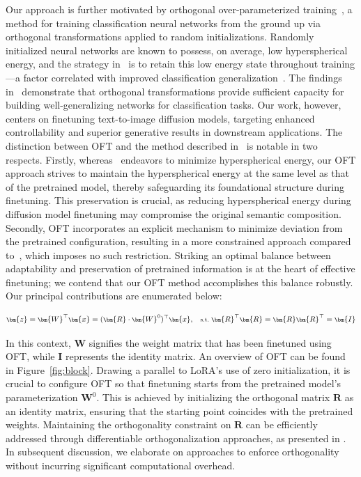 Our approach is further motivated by orthogonal over-parameterized training~\cite{liu2021orthogonal}, a method for training classification neural networks from the ground up via orthogonal transformations applied to random initializations. Randomly initialized neural networks are known to possess, on average, low hyperspherical energy, and the strategy in~\cite{liu2021orthogonal} is to retain this low energy state throughout training—a factor correlated with improved classification generalization~\cite{liu2018learning,lin2020regularizing}. The findings in~\cite{liu2021orthogonal} demonstrate that orthogonal transformations provide sufficient capacity for building well-generalizing networks for classification tasks. Our work, however, centers on finetuning text-to-image diffusion models, targeting enhanced controllability and superior generative results in downstream applications. The distinction between OFT and the method described in~\cite{liu2021orthogonal} is notable in two respects. Firstly, whereas~\cite{liu2021orthogonal} endeavors to minimize hyperspherical energy, our OFT approach strives to maintain the hyperspherical energy at the same level as that of the pretrained model, thereby safeguarding its foundational structure during finetuning. This preservation is crucial, as reducing hyperspherical energy during diffusion model finetuning may compromise the original semantic composition. Secondly, OFT incorporates an explicit mechanism to minimize deviation from the pretrained configuration, resulting in a more constrained approach compared to~\cite{liu2021orthogonal}, which imposes no such restriction. Striking an optimal balance between adaptability and preservation of pretrained information is at the heart of effective finetuning; we contend that our OFT method accomplishes this balance robustly. Our principal contributions are enumerated below:

\begin{equation}\label{eq:oft_general}
    \footnotesize
    \bm{z}=\bm{W}^\top\bm{x}=(\bm{R}\cdot\bm{W}^0)^\top\bm{x},~~~\text{s.t.}~\bm{R}^\top\bm{R}=\bm{R}\bm{R}^\top=\bm{I}
\end{equation}

In this context, $\bm{W}$ signifies the weight matrix that has been finetuned using OFT, while $\bm{I}$ represents the identity matrix. An overview of OFT can be found in Figure~\ref{fig:block}. Drawing a parallel to LoRA’s use of zero initialization, it is crucial to configure OFT so that finetuning starts from the pretrained model’s parameterization $\bm{W}^0$. This is achieved by initializing the orthogonal matrix $\bm{R}$ as an identity matrix, ensuring that the starting point coincides with the pretrained weights. Maintaining the orthogonality constraint on $\bm{R}$ can be efficiently addressed through differentiable orthogonalization approaches, as presented in \cite{liu2021orthogonal,lezcano2019cheap}. In subsequent discussion, we elaborate on approaches to enforce orthogonality without incurring significant computational overhead.


